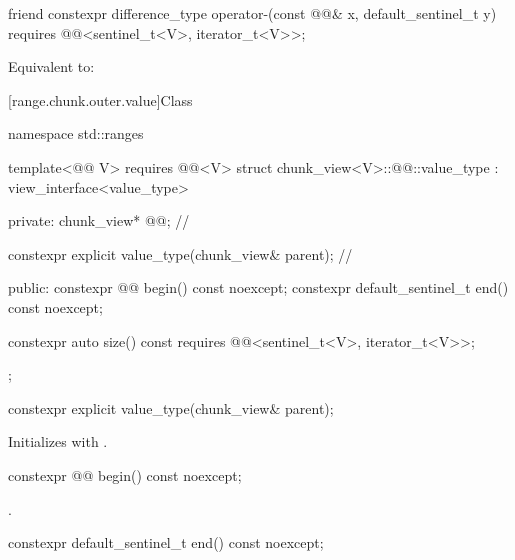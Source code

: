 \begin{itemdecl}
friend constexpr difference_type operator-(const @@& x, default_sentinel_t y)
  requires @@<sentinel_t<V>, iterator_t<V>>;
\end{itemdecl}

\begin{itemdescr}
\pnum
\effects
Equivalent to: 
\end{itemdescr}

[range.chunk.outer.value]{Class }

%
\begin{codeblock}
namespace std::ranges {
  template<@@ V>
    requires @@<V>
  struct chunk_view<V>::@@::value_type : view_interface<value_type> {
  private:
    chunk_view* @@;                                        // \expos

    constexpr explicit value_type(chunk_view& parent);          // \expos

  public:
    constexpr @@ begin() const noexcept;
    constexpr default_sentinel_t end() const noexcept;

    constexpr auto size() const
      requires @@<sentinel_t<V>, iterator_t<V>>;
  };
}
\end{codeblock}

\begin{itemdecl}
constexpr explicit value_type(chunk_view& parent);
\end{itemdecl}

\begin{itemdescr}
\pnum
\effects
Initializes  with .
\end{itemdescr}

\begin{itemdecl}
constexpr @@ begin() const noexcept;
\end{itemdecl}

\begin{itemdescr}
\pnum
\returns
{}.
\end{itemdescr}

\begin{itemdecl}
constexpr default_sentinel_t end() const noexcept;
\end{itemdecl}

